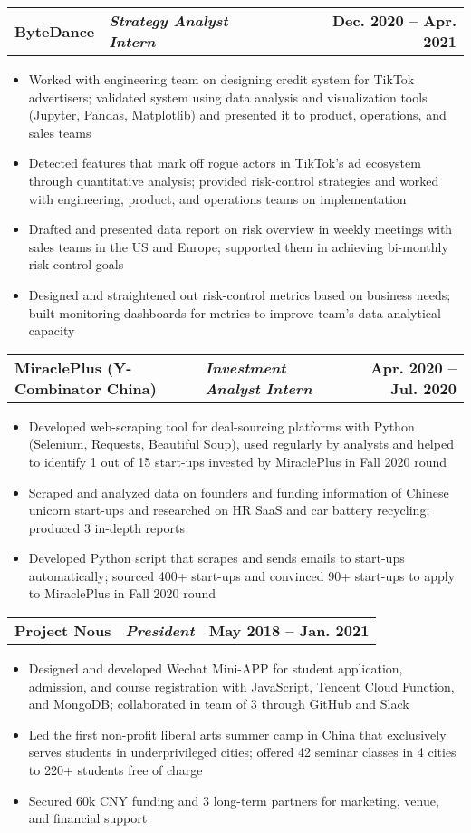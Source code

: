 \documentclass[11pt,a4paper,extrafontsizes,twoside]{memoir}
\makeatletter
\newcommand{\resumeItem}[1]{
  \item\small{
    {#1 \vspace{-2pt}}
  }
}
\newcommand{\resumeSubheading}[3]{
  \vspace{-2pt}\item
    \begin{tabular*}{1.0\textwidth}[t]{p{7.5cm} p{8cm} @{\extracolsep{\fill}} r}
      \textbf{\color{emph}#1} & \textbf{\textit{\color{emph}\small#3}} & \textbf{\footnotesize #2} \\
    \end{tabular*}\vspace{-7pt}
}
\newcommand{\resumeItemListStart}{\begin{itemize}}
\newcommand{\resumeItemListEnd}{\end{itemize}\vspace{-5pt}}
\makeatother
\begin{document}
    \resumeSubheading
      {ByteDance}{Dec. 2020 -- Apr. 2021}
      {Strategy Analyst Intern}
      \resumeItemListStart
        \resumeItem{Worked with engineering team on designing credit system for TikTok advertisers; validated system using data analysis and visualization tools (Jupyter, Pandas, Matplotlib) and presented it to product, operations, and sales teams}
        \resumeItem{Detected features that mark off rogue actors in TikTok's ad ecosystem through quantitative analysis; provided risk-control strategies and worked with engineering, product, and operations teams on implementation}
        \resumeItem{Drafted and presented data report on risk overview in weekly meetings with sales teams in the US and Europe; supported them in achieving bi-monthly risk-control goals}
        \resumeItem{Designed and straightened out risk-control metrics based on business needs; built monitoring  dashboards for metrics to improve team’s data-analytical capacity}
    \resumeItemListEnd

    \resumeSubheading
      {MiraclePlus (Y-Combinator China)}{Apr. 2020 -- Jul. 2020}
      {Investment Analyst Intern}
      \resumeItemListStart
        \resumeItem{Developed web-scraping tool for deal-sourcing platforms with Python (Selenium, Requests, Beautiful Soup), used regularly by analysts and helped to identify 1 out of 15 start-ups invested by MiraclePlus in Fall 2020 round}
        \resumeItem{Scraped and analyzed data on founders and funding information of Chinese unicorn start-ups and researched on HR SaaS and car battery recycling; produced 3 in-depth reports}
        \resumeItem{Developed Python script that scrapes and sends emails to start-ups automatically; sourced 400+ start-ups and convinced 90+ start-ups to apply to MiraclePlus in Fall 2020 round}
    \resumeItemListEnd

    \resumeSubheading
      {Project Nous}{May 2018 -- Jan. 2021}
      {President}
      \resumeItemListStart
        \resumeItem{Designed and developed Wechat Mini-APP for student application, admission, and course registration with JavaScript, Tencent Cloud Function, and MongoDB; collaborated in team of 3 through GitHub and Slack}
        \resumeItem{Led the first non-profit liberal arts summer camp in China that exclusively serves students in underprivileged cities; offered 42 seminar classes in 4 cities to 220+ students free of charge}
        \resumeItem{Secured 60k CNY funding and 3 long-term partners for marketing, venue, and financial support}
    \resumeItemListEnd
\end{document}
